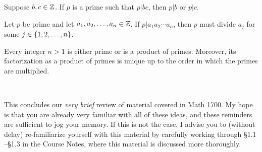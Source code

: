 \documentclass[11pt,fleqn,dvipsnames,usenames]{article}
\newcommand{\p}{\noindent}
\begin{document}
\begin{theorem*}\label{euclidslemma}
Suppose $b,c\in\mathbb{Z}$.  If $p$ is a prime such that $p|bc$, then $p|b$ or $p|c$.
\end{theorem*}
%
\begin{corollary*} Let $p$ be prime and let $a_{1},a_{2},\ldots, a_{n}\in\mathbb{Z}$.  If $p|a_{1}a_{2}\cdots a_{n}$, then $p$ must divide $a_{j}$ for some $j\in\left\{1,2,\ldots, n\right\}$.
\end{corollary*}
%
\begin{theorem}
Every integer $n > 1$ is either prime or is a product of primes.  Moreover, its factorization as a product of primes is unique up to the order in which the primes are multiplied.
\end{theorem}
%
\begin{examples*}~
\vspace{5cm}

\end{examples*}

\p This concludes our \emph{very brief} review of material covered in Math 1700.  My hope is that you are already very familiar with all of these ideas, and these reminders are sufficient to jog your memory.  If this is not the case, I advise you to (without delay) re-familiarize yourself with this material by carefully working through \S 1.1 \nolinebreak --\nolinebreak  \S 1.3 in the Course Notes, where this material is discussed more thoroughly.
\end{document}
